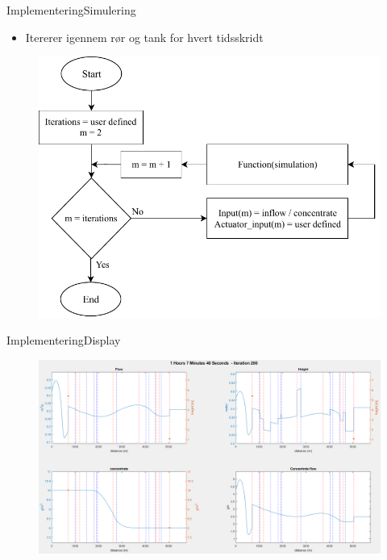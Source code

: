 \begin{frame}{Implementering}{Simulering}
    \begin{itemize}
    	\item Itererer igennem rør og tank for hvert tidsskridt 
    \end{itemize}

    \begin{figure}[H]
\centering
\includegraphics[width=0.5 \textwidth]{figures/simu_main_chart.pdf}
\label{fig:simu_main_chart}
\end{figure}

\end{frame}

\begin{frame}{Implementering}{Display}
     \begin{figure}[h]
 \centering
 \includegraphics[width=1.0 \textwidth]{figures/display_result_matlab.png}
 \label{fig:display_result_matlab}
 \end{figure}
\end{frame}


